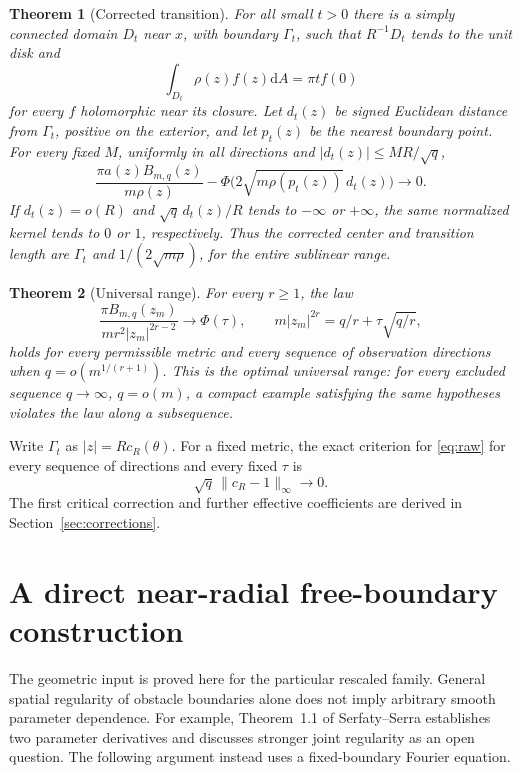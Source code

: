 \documentclass[11pt]{article}
\newtheorem{theorem}{Theorem}
\theoremstyle{remark}\newtheorem{remark}[theorem]{Remark}
\newcommand{\dA}{\mathrm dA}
\newcommand{\PhiG}{\Phi}
\begin{document}
\begin{theorem}[Corrected transition]\label{thm:corrected}
For all small $t>0$ there is a simply connected domain $D_t$ near $x$,
with boundary $\Gamma_t$, such that $R^{-1}D_t$ tends to the unit disk
and
\begin{equation}\label{eq:quadrature}
 \int_{D_t}\rho(z)f(z)\dA=\pi t f(0)
\end{equation}
for every $f$ holomorphic near its closure. Let $d_t(z)$ be signed
Euclidean distance from $\Gamma_t$, positive on the exterior, and let
$p_t(z)$ be the nearest boundary point. For every fixed $M$, uniformly
in all directions and $|d_t(z)|\leq MR/\sqrt q$,
\begin{equation}\label{eq:edge}
 \frac{\pi a(z)B_{m,q}(z)}{m\rho(z)}
 -\PhiG\bigl(2\sqrt{m\rho(p_t(z))}\,d_t(z)\bigr)\longrightarrow0.
\end{equation}
If $d_t(z)=o(R)$ and $\sqrt q\,d_t(z)/R$ tends to $-\infty$ or
$+\infty$, the same normalized kernel tends to $0$ or $1$, respectively.
Thus the corrected center and transition length are $\Gamma_t$ and
$1/(2\sqrt{m\rho})$, for the entire sublinear range.
\end{theorem}

\begin{theorem}[Universal range]\label{thm:range}
For every $r\geq1$, the law
\begin{equation}\label{eq:raw}
 \frac{\pi B_{m,q}(z_m)}{mr^2|z_m|^{2r-2}}
 \longrightarrow\PhiG(\tau),\qquad
 m|z_m|^{2r}=q/r+\tau\sqrt{q/r},
\end{equation}
holds for every permissible metric and every sequence of observation
directions when
$q=o(m^{1/(r+1)})$. This is the optimal universal range: for every
excluded sequence $q\to\infty$, $q=o(m)$, a compact example satisfying
the same hypotheses violates the law along a subsequence.
\end{theorem}

Write $\Gamma_t$ as $|z|=R c_R(\theta)$. For a fixed metric, the exact
criterion for \eqref{eq:raw} for every sequence of directions and every
fixed $\tau$ is
\begin{equation}\label{eq:criterion}
 \sqrt q\,\|c_R-1\|_\infty\longrightarrow0.
\end{equation}
The first critical correction and further effective coefficients are
derived in Section~\ref{sec:corrections}.

\section{A direct near-radial free-boundary construction}
The geometric input is proved here for the particular rescaled family.
General spatial regularity of obstacle boundaries alone does not imply
arbitrary smooth parameter dependence. For example,
Theorem~1.1 of Serfaty--Serra \cite{SS} establishes two parameter
derivatives and discusses stronger joint regularity as an open question.
The following argument instead uses a fixed-boundary Fourier equation.
\end{document}

